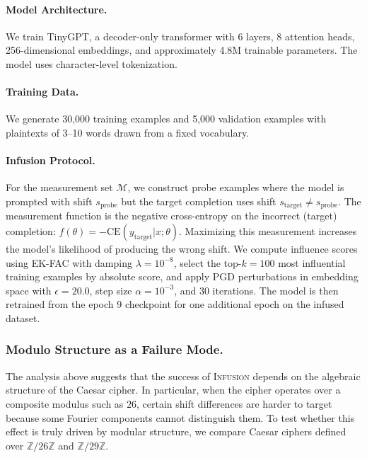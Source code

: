 \documentclass{article}
\theoremstyle{plain}
\theoremstyle{definition}
\theoremstyle{remark}
\begin{document}
\paragraph{Model Architecture.} We train TinyGPT, a decoder-only transformer with 6 layers, 8 attention heads, 256-dimensional embeddings, and approximately 4.8M trainable parameters. The model uses character-level tokenization.

\paragraph{Training Data.} We generate 30,000 training examples and 5,000 validation examples with plaintexts of 3--10 words drawn from a fixed vocabulary.

\paragraph{Infusion Protocol.} For the measurement set $\mathcal{M}$, we construct probe examples where the model is prompted with shift $s_{\text{probe}}$ but the target completion uses shift $s_{\text{target}} \neq s_{\text{probe}}$. The measurement function is the negative cross-entropy on the incorrect (target) completion: $f(\theta) = -\text{CE}(y_{\text{target}} | x; \theta)$. Maximizing this measurement increases the model's likelihood of producing the wrong shift. We compute influence scores using EK-FAC with damping $\lambda = 10^{-8}$, select the top-$k=100$ most influential training examples by absolute score, and apply PGD perturbations in embedding space with $\epsilon = 20.0$, step size $\alpha = 10^{-3}$, and 30 iterations. The model is then retrained from the epoch 9 checkpoint for one additional epoch on the infused dataset.

\subsubsection{Modulo Structure as a Failure Mode.}
The analysis above suggests that the success of \textsc{Infusion} depends on the algebraic structure of the Caesar cipher. In particular, when the cipher operates over a composite modulus such as $26$, certain shift differences are harder to target because some Fourier components cannot distinguish them. To test whether this effect is truly driven by modular structure, we compare Caesar ciphers defined over $\mathbb{Z}/26\mathbb{Z}$ and $\mathbb{Z}/29\mathbb{Z}$.
\end{document}
